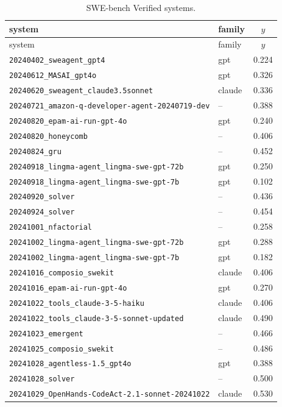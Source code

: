 \documentclass{article}
\begin{document}
\begin{center}\scriptsize
\begin{longtable}{llc}
\caption{SWE-bench Verified systems.}\label{tab:swe-systems}\\
\toprule
system & family & $y$ \\
\midrule
\endfirsthead
\toprule
system & family & $y$ \\
\midrule
\endhead
\bottomrule
\endlastfoot
\texttt{20240402\_sweagent\_gpt4} & gpt & 0.224 \\
\texttt{20240612\_MASAI\_gpt4o} & gpt & 0.326 \\
\texttt{20240620\_sweagent\_claude3.5sonnet} & claude & 0.336 \\
\texttt{20240721\_amazon-q-developer-agent-20240719-dev} & -- & 0.388 \\
\texttt{20240820\_epam-ai-run-gpt-4o} & gpt & 0.240 \\
\texttt{20240820\_honeycomb} & -- & 0.406 \\
\texttt{20240824\_gru} & -- & 0.452 \\
\texttt{20240918\_lingma-agent\_lingma-swe-gpt-72b} & gpt & 0.250 \\
\texttt{20240918\_lingma-agent\_lingma-swe-gpt-7b} & gpt & 0.102 \\
\texttt{20240920\_solver} & -- & 0.436 \\
\texttt{20240924\_solver} & -- & 0.454 \\
\texttt{20241001\_nfactorial} & -- & 0.258 \\
\texttt{20241002\_lingma-agent\_lingma-swe-gpt-72b} & gpt & 0.288 \\
\texttt{20241002\_lingma-agent\_lingma-swe-gpt-7b} & gpt & 0.182 \\
\texttt{20241016\_composio\_swekit} & claude & 0.406 \\
\texttt{20241016\_epam-ai-run-gpt-4o} & gpt & 0.270 \\
\texttt{20241022\_tools\_claude-3-5-haiku} & claude & 0.406 \\
\texttt{20241022\_tools\_claude-3-5-sonnet-updated} & claude & 0.490 \\
\texttt{20241023\_emergent} & -- & 0.466 \\
\texttt{20241025\_composio\_swekit} & -- & 0.486 \\
\texttt{20241028\_agentless-1.5\_gpt4o} & gpt & 0.388 \\
\texttt{20241028\_solver} & -- & 0.500 \\
\texttt{20241029\_OpenHands-CodeAct-2.1-sonnet-20241022} & claude & 0.530 \\

\end{longtable}
\end{center}
\end{document}
